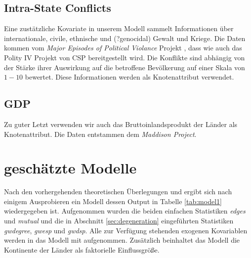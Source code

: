 \documentclass[a4paper,ngerman,oneside,titlepage,bibliography=totoc,11pt]{scrreprt}
\begin{document}
\subsection{Intra-State Conflicts}
Eine zustätzliche Kovariate in unserem Modell sammelt Informationen über internationale, civile, ethnische und (?genocidal) Gewalt und Kriege. Die Daten kommen vom \emph{Major Episodes of Political Violance} Projekt \citep{conflict}, dass wie auch das Polity IV Projekt von CSP bereitgestellt wird. Die Konflikte sind abhängig von der Stärke ihrer Auswirkung auf die betroffene Bevölkerung auf einer Skala von $1-10$ bewertet. Diese Informationen werden als Knotenattribut verwendet.

\subsection{GDP}
Zu guter Letzt verwenden wir auch das Bruttoinlandsprodukt der Länder als Knotenattribut. Die Daten entstammen dem \emph{Maddison Project}\citep{GDP}. 

\section{geschätzte Modelle}

Nach den vorhergehenden theoretischen Überlegungen und ergibt sich nach einigem Ausprobieren ein Modell dessen Output in Tabelle \ref{tab:model1} wiedergegeben ist. Aufgenommen wurden die beiden einfachen Statistiken \emph{edges} und \emph{mutual} und die in Abschnitt \ref{sec:degeneration} eingeführten Statistiken \emph{gwdegree}, \emph{gwesp} und \emph{gwdsp}. Alle zur Verfügung stehenden exogenen Kovariablen werden in das Modell mit aufgenommen. Zusätzlich beinhaltet das Modell die Kontinente der Länder als faktorielle Einflussgröße.
\end{document}

